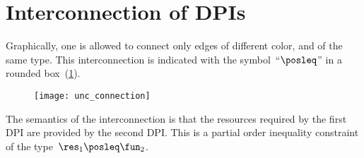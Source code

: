 \section{Interconnection of DPIs}

Graphically, one is allowed to connect only edges of different
color, and of the same type. This interconnection is indicated with the symbol~``$\posleq$''
in a rounded box~(\cref{fig:connection}).

\begin{figure}[h]
  \centering
  \texttt{[image: unc\_connection]}
  \caption{\label{fig:connection}}
\end{figure}


\noindent The semantics of the interconnection is that the resources
required by the first DPI are provided by the second DPI. This is
a partial order inequality constraint of the type~$\res_{1}\posleq\fun_{2}$.




